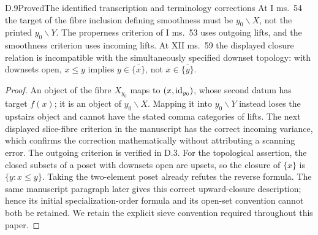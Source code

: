 \begin{statement}{D.9}{Proved}{The identified transcription and terminology corrections}
At I ms.~54 the target of the fibre inclusion defining smoothness must be $y_0\backslash X$, not the printed $y_0\backslash Y$. The properness criterion of I ms.~53 uses outgoing lifts, and the smoothness criterion uses incoming lifts. At XII ms.~59 the displayed closure relation is incompatible with the simultaneously specified downset topology: with downsets open, $x\leq y$ implies $y\in\overline{\{x\}}$, not $x\in\overline{\{y\}}$.
\end{statement}
\begin{proof}
An object of the fibre $X_{y_0}$ maps to $(x,\mathrm{id}_{y_0})$, whose second datum has target $f(x)$; it is an object of $y_0\backslash X$. Mapping it into $y_0\backslash Y$ instead loses the upstairs object and cannot have the stated comma categories of lifts. The next displayed slice-fibre criterion in the manuscript has the correct incoming variance, which confirms the correction mathematically without attributing a scanning error. The outgoing criterion is verified in D.3. For the topological assertion, the closed subsets of a poset with downsets open are upsets, so the closure of $\{x\}$ is $\{y:x\leq y\}$. Taking the two-element poset already refutes the reverse formula. The same manuscript paragraph later gives this correct upward-closure description; hence its initial specialization-order formula and its open-set convention cannot both be retained. We retain the explicit sieve convention required throughout this paper.
\end{proof}
